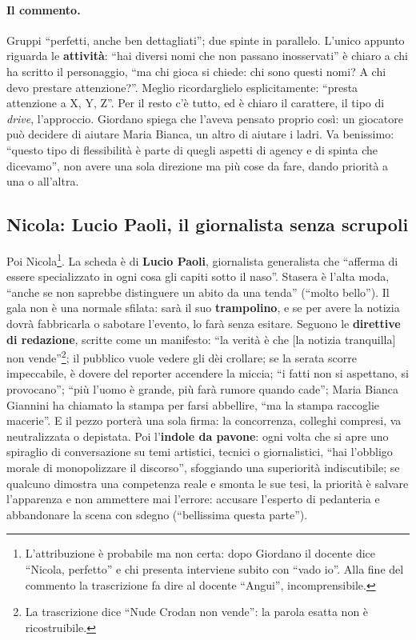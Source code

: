\paragraph{Il commento.} Gruppi ``perfetti, anche ben dettagliati''; due spinte in
parallelo. L'unico appunto riguarda le \textbf{attività}: ``hai diversi nomi che non
passano inosservati'' è chiaro a chi ha scritto il personaggio, ``ma chi gioca si
chiede: chi sono questi nomi? A chi devo prestare attenzione?''. Meglio
ricordarglielo esplicitamente: ``presta attenzione a X, Y, Z''. Per il resto c'è
tutto, ed è chiaro il carattere, il tipo di \emph{drive}, l'approccio. Giordano
spiega che l'aveva pensato proprio così: un giocatore può decidere di aiutare
Maria Bianca, un altro di aiutare i ladri. Va benissimo: ``questo tipo di
flessibilità è parte di quegli aspetti di agency e di spinta che dicevamo'', non
avere una sola direzione ma più cose da fare, dando priorità a una o all'altra.

\subsection{Nicola: Lucio Paoli, il giornalista senza scrupoli}

Poi Nicola\footnote{L'attribuzione è probabile ma non certa: dopo Giordano il
docente dice ``Nicola, perfetto'' e chi presenta interviene subito con ``vado io''.
Alla fine del commento la trascrizione fa dire al docente ``Angui'',
incomprensibile.}. La scheda è di \textbf{Lucio Paoli}, giornalista generalista che
``afferma di essere specializzato in ogni cosa gli capiti sotto il naso''.
Stasera è l'alta moda, ``anche se non saprebbe distinguere un abito da una
tenda'' (``molto bello''). Il gala non è una normale sfilata: sarà il suo
\textbf{trampolino}, e se per avere la notizia dovrà fabbricarla o sabotare
l'evento, lo farà senza esitare. Seguono le \textbf{direttive di redazione}, scritte
come un manifesto: ``la verità è che [la notizia tranquilla] non vende''\footnote{La trascrizione
dice ``Nude Crodan non vende'': la parola esatta non è ricostruibile.}; il pubblico
vuole vedere gli dèi crollare; se la serata scorre impeccabile, è dovere del
reporter accendere la miccia; ``i fatti non si aspettano, si provocano''; ``più
l'uomo è grande, più farà rumore quando cade''; Maria Bianca Giannini ha chiamato
la stampa per farsi abbellire, ``ma la stampa raccoglie macerie''. E il pezzo
porterà una sola firma: la concorrenza, colleghi compresi, va neutralizzata o
depistata. Poi l'\textbf{indole da pavone}: ogni volta che si apre uno spiraglio di
conversazione su temi artistici, tecnici o giornalistici, ``hai l'obbligo morale di
monopolizzare il discorso'', sfoggiando una superiorità indiscutibile; se qualcuno
dimostra una competenza reale e smonta le sue tesi, la priorità è salvare
l'apparenza e non ammettere mai l'errore: accusare l'esperto di pedanteria e
abbandonare la scena con sdegno (``bellissima questa parte'').

